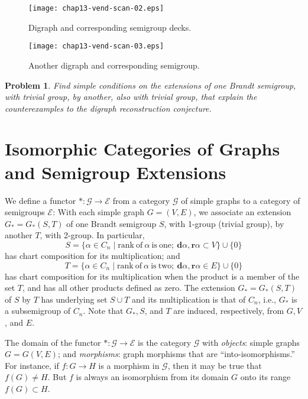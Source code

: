 \documentclass{surv-l}
\numberwithin{equation}{section}
\numberwithin{table}{section}
\numberwithin{figure}{section}
\theoremstyle{plain}
\newtheorem{problem}[equation]{Problem}
\theoremstyle{definition}
\begin{document}
\begin{figure}[!h]
\texttt{[image: chap13-vend-scan-02.eps]}
\caption{Digraph and corresponding semigroup decks.}\label{fig13.66.2}
\end{figure}

\begin{figure}[!h]
\texttt{[image: chap13-vend-scan-03.eps]}
\caption{Another digraph and corresponding semigroup.}\label{fig13.66.3}
\end{figure}

\setcounter{equation}{3}
\begin{problem}\label{prob13.66.4}
Find simple conditions on the extensions of one
Brandt semigroup, with trivial group, by another,
also with trivial group, that explain the counterexamples to the
digraph reconstruction conjecture.
\end{problem}

\section{Isomorphic Categories of Graphs and Semigroup Extensions}\label{sec13.67}

We define a functor $*:\mathcal{G}\rightarrow \mathcal{E}$
from a category $\mathcal{G}$ of simple graphs to a category
of semigroups $\mathcal{E}$: With each simple graph $G=(V,
E)$, we associate an extension $G_{\ast}=G_{\ast}(S,T)$ of one
Brandt semigroup $S$, with 1-group (trivial group), by another
$T$, with 2-group. In particular,
\[
S=\{\alpha\in C_{n}\mid \mathrm{rank\ of}\ \alpha\ \mathrm{is\ one;}\
\mathbf{d}\alpha,\mathbf{r}\alpha\subset V\} \cup\{0\}
\]
has chart composition for its multiplication; and
\[
T=\{\alpha\in C_{n}\mid \mathrm{rank\ of}\ \alpha\ \mathrm{is\ two;}\
\mathbf{d}\alpha,\mathbf{r}\alpha\in E\}\cup\{0\}
\]
has chart composition for its multiplication when the product
is a member of the set $T$, and has all other products defined
as zero. The extension $G_{\ast}=G_{\ast}(S, T)$ of $S$ by $T$
has underlying set $S \cup T$ and its multiplication is that
of $C_{n}$, i.e., $G_{\ast}$ is a subsemigroup of $C_{n}$.
Note that $G_{\ast}, S$, and $T$ are induced, respectively,
from $G, V$, and $E$.

The domain of the functor $*:\mathcal{G}\rightarrow \mathcal{E}$
is the category $\mathcal{G}$ with \emph{objects}: simple graphs
$G=G(V, E)$; and \emph{morphisms}: graph morphisms that are
``into-isomorphisms.'' For instance, if $f : G\rightarrow H$ is a
morphism in $\mathcal{G}$, then it may be true that $ f(G)\neq H$.
But $f$ is always an isomorphism from its domain $G$ onto its
range $ f(G)\subset H$.
\end{document}
